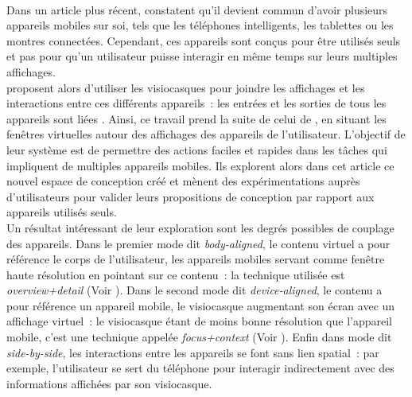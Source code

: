 
\paragraph*{}
Dans un article plus récent, \cite{GrubertKranzQuigley2015} constatent qu'il devient commun d'avoir plusieurs appareils mobiles sur soi, tels que les téléphones intelligents, les tablettes ou les montres connectées. Cependant, ces appareils sont conçus pour être utilisés seuls et pas pour qu'un utilisateur puisse interagir en même temps sur leurs multiples affichages.\\
\citeauthor{GrubertKranzQuigley2015} proposent alors d'utiliser les visiocasques pour joindre les affichages et les interactions entre ces différents appareils~: les entrées et les sorties de tous les appareils sont liées . Ainsi, ce travail prend la suite de celui de \citet{EnsFinneganIrani2014}, en situant les fenêtres virtuelles autour des affichages des appareils de l'utilisateur. L'objectif de leur système est de permettre des actions faciles et rapides dans les tâches qui impliquent de multiples appareils mobiles. Ils explorent alors dans cet article ce nouvel espace de conception créé et mènent des expérimentations auprès d'utilisateurs pour valider leurs propositions de conception par rapport aux appareils utilisés seuls.\\
Un résultat intéressant de leur exploration sont les degrés possibles de couplage des appareils. Dans le premier mode dit \emph{body-aligned}, le contenu virtuel a pour référence le corps de l'utilisateur, les appareils mobiles servant comme fenêtre haute résolution en pointant sur ce contenu~: la technique utilisée est \emph{overview+detail} (Voir \citep{BergeSerranoPerelmanEtAl2014}). Dans le second mode dit \emph{device-aligned}, le contenu a pour référence un appareil mobile, le visiocasque augmentant son écran avec un affichage virtuel~: le visiocasque étant de moins bonne résolution que l'appareil mobile, c'est une technique appelée \emph{focus+context} (Voir \cite{BaudischGoodStewart2001}). Enfin dans mode dit \emph{side-by-side}, les interactions entre les appareils se font sans lien spatial~: par exemple, l'utilisateur se sert du téléphone pour interagir indirectement avec des informations affichées par son visiocasque.\\
